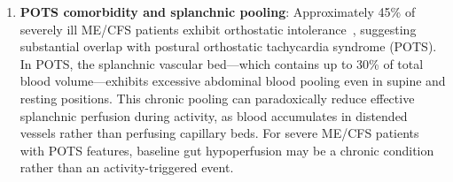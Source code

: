\begin{hypothesis}
\begin{enumerate}
    \item \textbf{POTS comorbidity and splanchnic pooling}: Approximately 45\% of severely ill ME/CFS patients exhibit orthostatic intolerance~\cite{Komaroff2021severe}, suggesting substantial overlap with postural orthostatic tachycardia syndrome (POTS). In POTS, the splanchnic vascular bed---which contains up to 30\% of total blood volume---exhibits excessive abdominal blood pooling even in supine and resting positions. This chronic pooling can paradoxically reduce effective splanchnic perfusion during activity, as blood accumulates in distended vessels rather than perfusing capillary beds. For severe ME/CFS patients with POTS features, baseline gut hypoperfusion may be a chronic condition rather than an activity-triggered event.
\end{enumerate}
\end{hypothesis}

